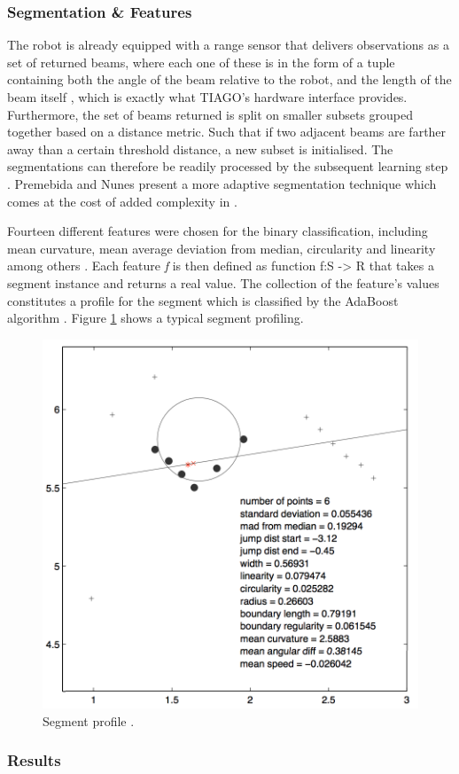\subsubsection{Segmentation \& Features}

The robot is already equipped with a range sensor that delivers observations as a set of returned beams, where each one of these is in the form of a tuple containing both the angle of the beam relative to the robot, and the length of the beam itself \cite{arras2007using}, which is exactly what TIAGO's hardware interface provides. Furthermore, the set of beams returned is split on smaller subsets grouped together based on a distance metric. Such that if two adjacent beams are farther away than a certain threshold distance, a new subset is initialised. The segmentations can therefore be readily processed by the subsequent learning step \cite{arras2007using}. Premebida and Nunes present a more adaptive segmentation technique which comes at the cost of added complexity in \cite{premebida2005segmentation}.

Fourteen different features were chosen for the binary classification, including mean curvature, mean average deviation from median, circularity and linearity among others \cite{arras2007using}. Each feature \textit{f} is then defined as function f:S -> R that takes a segment instance and returns a real value. The collection of the feature's values constitutes a profile for the segment which is classified by the AdaBoost algorithm \cite{arras2007using}. Figure \ref{fig:features} shows a typical segment profiling.

\begin{figure}[!htbp]
\begin{center}
\includegraphics[width=.4\linewidth]{images/segment_profile.png}
\end{center}
\caption{Segment profile \cite{arras2007using}.}
\label{fig:features}
\end{figure}

\subsubsection{Results}

